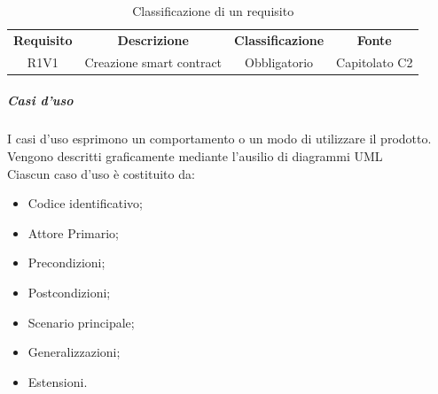             \begin{table}[H]
              \centering
              \renewcommand{\arraystretch}{1.8}
              \begin{tabular}{cccc}
                \rowcolor[HTML]{125E28} 
                \color[HTML]{FFFFFF}\textbf{Requisito}
              & \color[HTML]{FFFFFF}\textbf{Descrizione} 
              & \color[HTML]{FFFFFF}\textbf{Classificazione} 
              & \color[HTML]{FFFFFF}\textbf{Fonte}\\
            
                R1V1  &  Creazione smart contract  &  Obbligatorio  &  Capitolato C2\\    
            
              \end{tabular}
              \caption{Classificazione di un requisito}
            \end{table}
                        
            \subparagraph{Casi d'uso} \label{subparagraph:Casi d'uso}
            I casi d'uso esprimono un comportamento o un modo di utilizzare il prodotto.\\
            Vengono descritti graficamente mediante l'ausilio di diagrammi UML\glo\\
            Ciascun caso d'uso è costituito da:
            \begin{itemize}
                \item Codice identificativo;
                \item Attore Primario;
                \item Precondizioni;
                \item Postcondizioni;
                \item Scenario principale;
                \item Generalizzazioni;
                \item Estensioni.
            \end{itemize}

